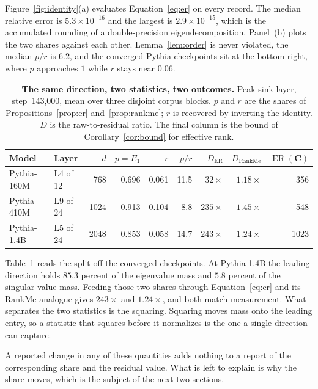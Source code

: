 \documentclass{article}
\theoremstyle{spaced}
\theoremstyle{definition}
\DeclareMathOperator{\ER}{ER}
\DeclareMathOperator{\RankMe}{RankMe}
\newcommand{\bC}{\mathbf{C}}
\begin{document}
Figure~\ref{fig:identity}(a) evaluates Equation~\ref{eq:er} on every record. The median relative error is $5.3\times10^{-16}$ and the largest is $2.9\times10^{-15}$, which is the accumulated rounding of a double-precision eigendecomposition. Panel~(b) plots the two shares against each other. Lemma~\ref{lem:order} is never violated, the median $p/r$ is $6.2$, and the converged Pythia checkpoints sit at the bottom right, where $p$ approaches $1$ while $r$ stays near $0.06$.

\begin{table}[t]
\centering
\caption{\textbf{The same direction, two statistics, two outcomes.} Peak-sink layer, step~143{,}000, mean over three disjoint corpus blocks. $p$ and $r$ are the shares of Propositions~\ref{prop:er} and~\ref{prop:rankme}; $r$ is recovered by inverting the identity. $D$ is the raw-to-residual ratio. The final column is the bound of Corollary~\ref{cor:bound} for effective rank.}
\label{tab:split}
\small
\begin{tabular}{@{}llrrrrrrr@{}}
\toprule
\textbf{Model} & \textbf{Layer} & $d$ & $p = E_1$ & $r$ & $p/r$ & $D_{\ER}$ & $D_{\RankMe}$ & $\ER(\bC)$ \\
\midrule
Pythia-160M & L4 of 12  & 768  & 0.696 & 0.061 & 11.5 & $32\times$  & $1.18\times$ & 356 \\
Pythia-410M & L9 of 24  & 1024 & 0.913 & 0.104 & 8.8  & $235\times$ & $1.45\times$ & 548 \\
Pythia-1.4B & L5 of 24  & 2048 & 0.853 & 0.058 & 14.7 & $243\times$ & $1.24\times$ & 1023 \\
\bottomrule
\end{tabular}
\end{table}

Table~\ref{tab:split} reads the split off the converged checkpoints. At Pythia-1.4B the leading direction holds $85.3$ percent of the eigenvalue mass and $5.8$ percent of the singular-value mass. Feeding those two shares through Equation~\ref{eq:er} and its RankMe analogue gives $243\times$ and $1.24\times$, and both match measurement. What separates the two statistics is the squaring. Squaring moves mass onto the leading entry, so a statistic that squares before it normalizes is the one a single direction can capture.

A reported change in any of these quantities adds nothing to a report of the corresponding share and the residual value. What is left to explain is why the share moves, which is the subject of the next two sections.
\end{document}
